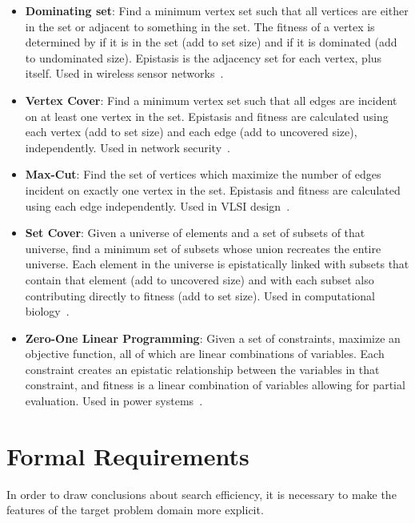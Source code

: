 \begin{itemize}
\item \textbf{Dominating set}: Find a minimum vertex
set such that all vertices are either in the set or adjacent to something in the set.
The fitness of a vertex is determined by if it is in the set (add to set size) and if
it is dominated (add to undominated size). Epistasis is the adjacency set for each
vertex, plus itself. Used in wireless sensor networks~\cite{zhao:2013:dominatingset}.

\item \textbf{Vertex Cover}: Find a minimum vertex
set such that all edges are incident on at least one vertex in the set.
Epistasis and fitness are calculated using each vertex (add to set size)
and each edge (add to uncovered size), independently. Used in network security~\cite{richter:2007:vertexcover}.

\item \textbf{Max-Cut}: Find the set of vertices which maximize the number of edges
incident on exactly one vertex in the set. Epistasis and fitness are calculated
using each edge independently. Used in VLSI design~\cite{festa:2002:maxcut}.

\item \textbf{Set Cover}: Given a universe of elements and a set of subsets of that universe,
find a minimum set of subsets whose union recreates the entire universe. Each element in
the universe is epistatically linked with subsets that contain that element (add to uncovered size)
and with each subset also contributing directly to fitness (add to set size). Used in
computational biology~\cite{painsky:2014:setcover}.

\item \textbf{Zero-One Linear Programming}: Given a set of constraints, maximize an
objective function, all of which are linear combinations of variables. Each constraint
creates an epistatic relationship between the variables in that constraint, and fitness
is a linear combination of variables allowing for partial evaluation. Used in power systems~\cite{arroyo:2000:linearprogram}.
\end{itemize}

\section{Formal Requirements}
In order to draw conclusions about search efficiency, it is necessary to make the features
of the target problem domain more explicit.

